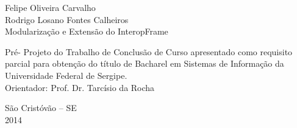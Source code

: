 
\newpage
\thispagestyle{empty}
\begin{titlepage}
    \begin{center}
        {\Large Felipe Oliveira Carvalho \\ Rodrigo Losano Fontes Calheiros }\\[8.3cm]
        {\LARGE Modularização e Extensão do InteropFrame} \\[4.3cm]
        \hspace{.45\textwidth} %
        \begin{minipage}{.5\textwidth}
            \singlespacing
                Pré- Projeto do Trabalho de Conclus\~ao de Curso apresentado como requisito parcial para obten\c c\~ao do t\'itulo de Bacharel em Sistemas de Informação da Universidade Federal de Sergipe. \\
                Orientador: Prof. Dr. Tarc\'isio da Rocha
            \onehalfspacing
        \end{minipage}
        \vfill
        {\large S\~ao Crist\'ov\~ao -- SE} \\
        {\large 2014}
    \end{center}
\end{titlepage}
\pagebreak

